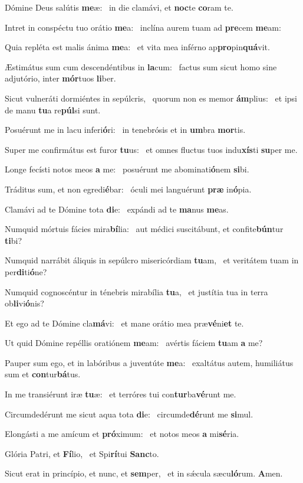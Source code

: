 \item Dómine Deus salútis \textbf{me}æ:~\psstar{} in die clamávi, et \textbf{noc}te \textbf{co}ram te.
\item Intret in conspéctu tuo orátio \textbf{me}a:~\psstar{} inclína aurem tuam ad \textbf{pre}cem \textbf{me}am:
\item Quia repléta est malis ánima \textbf{me}a:~\psstar{} et vita mea inférno ap\textbf{pro}pin\textbf{quá}vit.
\item Æstimátus sum cum descendéntibus in \textbf{la}cum:~\psstar{} factus sum sicut homo sine adjutório, inter \textbf{mór}tuos \textbf{li}ber.
\item Sicut vulneráti dormiéntes in sepúlcris,~\pscross{} quorum non es memor \textbf{ám}plius:~\psstar{} et ipsi de manu \textbf{tu}a re\textbf{púl}si sunt.
\item Posuérunt me in lacu inferi\textbf{ó}ri:~\psstar{} in tenebrósis et in \textbf{um}bra \textbf{mor}tis.
\item Super me confirmátus est furor \textbf{tu}us:~\psstar{} et omnes fluctus tuos indu\textbf{xís}ti \textbf{su}per me.
\item Longe fecísti notos meos \textbf{a} me:~\psstar{} posuérunt me abominati\textbf{ó}nem \textbf{si}bi.
\item Tráditus sum, et non egredi\textbf{é}bar:~\psstar{} óculi mei languérunt \textbf{præ} in\textbf{ó}pia.
\item Clamávi ad te Dómine tota \textbf{di}e:~\psstar{} expándi ad te \textbf{ma}nus \textbf{me}as.
\item Numquid mórtuis fácies mira\textbf{bí}lia:~\psstar{} aut médici suscitábunt, et confite\textbf{bún}tur \textbf{ti}bi?
\item Numquid narrábit áliquis in sepúlcro misericórdiam \textbf{tu}am,~\psstar{} et veritátem tuam in per\textbf{di}ti\textbf{ó}ne?
\item Numquid cognoscéntur in ténebris mirabília \textbf{tu}a,~\psstar{} et justítia tua in terra ob\textbf{li}vi\textbf{ó}nis?
\item Et ego ad te Dómine cla\textbf{má}vi:~\psstar{} et mane orátio mea præ\textbf{vé}ni\textbf{et} te.
\item Ut quid Dómine repéllis oratiónem \textbf{me}am:~\psstar{} avértis fáciem \textbf{tu}am \textbf{a} me?
\item Pauper sum ego, et in labóribus a juventúte \textbf{me}a:~\psstar{} exaltátus autem, humiliátus sum et \textbf{con}tur\textbf{bá}tus.
\item In me transiérunt iræ \textbf{tu}æ:~\psstar{} et terróres tui con\textbf{tur}ba\textbf{vé}runt me.
\item Circumdedérunt me sicut aqua tota \textbf{di}e:~\psstar{} circumde\textbf{dé}runt me \textbf{si}mul.
\item Elongásti a me amícum et \textbf{pró}ximum:~\psstar{} et notos meos \textbf{a} mi\textbf{sé}ria.
\item Glória Patri, et \textbf{Fí}lio,~\psstar{} et Spi\textbf{rí}tui \textbf{Sanc}to.
\item Sicut erat in princípio, et nunc, et \textbf{sem}per,~\psstar{} et in sǽcula sæcu\textbf{ló}rum. \textbf{A}men.
